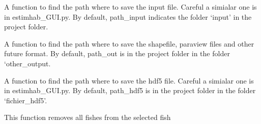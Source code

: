 \documentclass[letterpaper,10pt,english]{sphinxmanual}
\begin{document}
\begin{fulllineitems}
\begin{fulllineitems}
\begin{quote}
\begin{description}
\end{description}\end{quote}

\end{fulllineitems}


\begin{fulllineitems}
\label{\detokenize{index:src_GUI.estimhab_GUI.StatModUseful.find_path_input_est}}
A function to find the path where to save the input file. Careful a simialar one is in estimhab\_GUI.py. By default,
path\_input indicates the folder `input' in the project folder.

\end{fulllineitems}


\begin{fulllineitems}
\label{\detokenize{index:src_GUI.estimhab_GUI.StatModUseful.find_path_output_est}}
A function to find the path where to save the shapefile, paraview files and other future format. By default,
path\_out is in the project folder in the folder `other\_output.

\end{fulllineitems}


\begin{fulllineitems}
\label{\detokenize{index:src_GUI.estimhab_GUI.StatModUseful.find_path_text_est}}
A function to find the path where to save the hdf5 file. Careful a simialar one is in estimhab\_GUI.py. By default,
path\_hdf5 is in the project folder in the folder `fichier\_hdf5'.

\end{fulllineitems}


\begin{fulllineitems}
\label{\detokenize{index:src_GUI.estimhab_GUI.StatModUseful.remove_all_fish}}
This function removes all fishes from the selected fish


\end{fulllineitems}
\end{fulllineitems}
\end{document}
